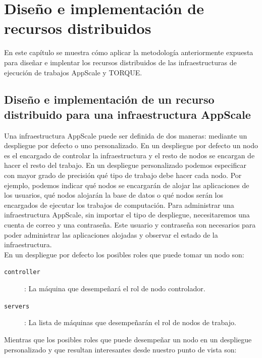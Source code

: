 \chapter{Diseño e implementación de recursos distribuidos}
\label{cap:disenyo}


En este capítulo se muestra cómo aplicar la metodología anteriormente expuesta para diseñar e implentar los recursos distribuidos de las infraestructuras de ejecución de trabajos AppScale y TORQUE.


\section{Diseño e implementación de un recurso distribuido para una infraestructura AppScale}

Una infraestructura AppScale puede ser definida de dos maneras: mediante un despliegue por defecto o uno personalizado. En un despliegue por defecto un nodo es el encargado de controlar la infraestructura y el resto de nodos se encargan de hacer el resto del trabajo. En un despliegue personalizado podemos especificar con mayor grado de precisión qué tipo de trabajo debe hacer cada nodo. Por ejemplo, podemos indicar qué nodos se encargarán de alojar las aplicaciones de los usuarios, qué nodos alojarán la base de datos o qué nodos serán los encargados de ejecutar los trabajos de computación. Para administrar una infraestructura AppScale, sin importar el tipo de despliegue, necesitaremos una cuenta de correo y una contraseña. Este usuario y contraseña son necesarios para poder administrar las aplicaciones alojadas y observar el estado de la infraestructura. \\

En un despliegue por defecto los posibles roles que puede tomar un nodo son:

\begin{description}
\item[\texttt{controller}]: La máquina que desempeñará el rol de nodo controlador.
\item[\texttt{servers}]: La lista de máquinas que desempeñarán el rol de nodos de trabajo.
\end{description}

Mientras que los posibles roles que puede desempeñar un nodo en un despliegue personalizado y que resultan interesantes desde nuestro punto de vista son:

